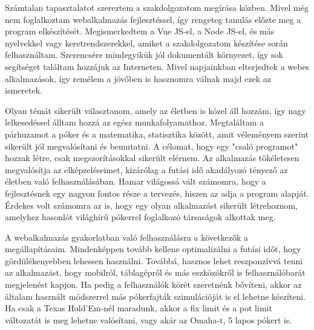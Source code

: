 
Számtalan tapasztalatot szereztem a szakdolgozatom megírása közben. Mivel még nem foglalkoztam webalkalmazás fejlesztéssel, így rengeteg tanulás előzte meg a program elkészítését. Megismerkedtem a Vue JS-el, a Node JS-el, és más nyelvekkel vagy keretrendszerekkel, amiket a szakdolgozatom készítése során felhasználtam. Szerencsére mindegyikük jól dokumentált környezet, így sok segítséget találtam hozzájuk az Interneten. Mivel napjainkban elterjedtek a webes alkalmazások, így remélem a jövőben is hasznomra válnak majd ezek az ismeretek.

Olyan témát sikerült választanom, amely az életben is közel áll hozzám, így nagy lelkesedéssel álltam hozzá az egész munkafolyamathoz. Megtaláltam a párhuzamot a póker és a matematika, statisztika között, amit véleményem szerint sikerült jól megvalósítani és bemutatni. A célomat, hogy egy "csaló programot" hozzak létre, csak megszorításokkal sikerült elérnem. Az alkalmazás tökéletesen megvalósítja az elképzeléseimet, kizárólag a futási idő akadályozó tényező az életben való felhasználásában. Hamar világossá vált számomra, hogy a fejlesztésnek egy nagyon fontos része a tervezés, hiszen az adja a program alapját. Érdekes volt számomra az is, hogy egy olyan alkalmazást sikerült létrehoznom, amelyhez hasonlót világhírű pókerrel foglalkozó társaságok alkottak meg.

A webalkalmazás gyakorlatban való felhasználásra a következők a megállapításaim. Mindenképpen tovább kellene optimalizálni a futási időt, hogy gördülékenyebben lehessen használni. Továbbá, hasznos lehet reszponzívvá tenni az alkalmazást, hogy mobilról, táblagépről és más eszközökről is felhasználóbarát megjelenést kapjon. Ha pedig a felhasználók körét szeretnénk bővíteni, akkor az általam használt módszerrel más pókerfajták szimulációját is el lehetne készíteni. Ha csak a Texas Hold'Em-nél maradunk, akkor a fix limit és a pot limit változatát is meg lehetne valósítani, vagy akár az Omaha-t, 5 lapos pókert is.
